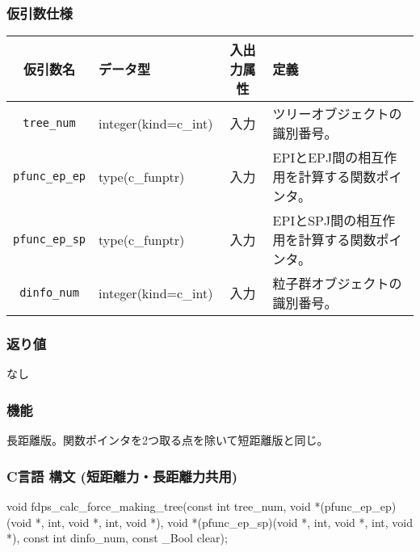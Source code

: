 \subsubsection*{仮引数仕様}
\begin{table}[h]
\begin{tabularx}{\linewidth}{cXcX}
\toprule
\rowcolor{Snow2}
仮引数名 & データ型 & 入出力属性 & 定義 \\
\midrule
\verb|tree_num|    & integer(kind=c\_int)   & 入力     & ツリーオブジェクトの識別番号。\\
\verb|pfunc_ep_ep| & type(c\_funptr)        & 入力     & EPIとEPJ間の相互作用を計算する関数ポインタ。\\
\verb|pfunc_ep_sp| & type(c\_funptr)        & 入力     & EPIとSPJ間の相互作用を計算する関数ポインタ。\\
\verb|dinfo_num|   & integer(kind=c\_int)   & 入力     & 粒子群オブジェクトの識別番号。\\
\bottomrule
\end{tabularx}
\end{table}

\subsubsection*{返り値}
なし

\subsubsection*{機能}
長距離版。関数ポインタを2つ取る点を除いて短距離版と同じ。
\clearpage

\subsubsection*{C言語 構文 (短距離力・長距離力共用)}
\begin{screen}
\begin{spverbatim}
void fdps_calc_force_making_tree(const int tree_num,
                                 void *(pfunc_ep_ep)(void *, int, void *, int, void *),
                                 void *(pfunc_ep_sp)(void *, int, void *, int, void *),
                                 const int dinfo_num,
                                 const _Bool clear);
\end{spverbatim}
\end{screen}

